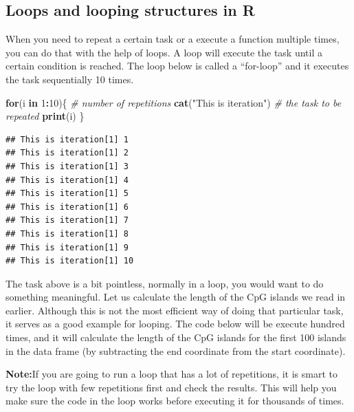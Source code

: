 \documentclass[12pt,]{krantz}
\newenvironment{Shaded}{\begin{snugshade}}{\end{snugshade}}
\newcommand{\CommentTok}[1]{\textcolor[rgb]{0.56,0.35,0.01}{\textit{#1}}}
\newcommand{\ControlFlowTok}[1]{\textcolor[rgb]{0.13,0.29,0.53}{\textbf{#1}}}
\newcommand{\DecValTok}[1]{\textcolor[rgb]{0.00,0.00,0.81}{#1}}
\newcommand{\KeywordTok}[1]{\textcolor[rgb]{0.13,0.29,0.53}{\textbf{#1}}}
\newcommand{\NormalTok}[1]{#1}
\newcommand{\OperatorTok}[1]{\textcolor[rgb]{0.81,0.36,0.00}{\textbf{#1}}}
\newcommand{\StringTok}[1]{\textcolor[rgb]{0.31,0.60,0.02}{#1}}
\theoremstyle{definition}
\theoremstyle{definition}
\theoremstyle{definition}
\theoremstyle{remark}
\begin{document}
\hypertarget{loops-and-looping-structures-in-r}{%
\subsection{Loops and looping structures in
R}\label{loops-and-looping-structures-in-r}}

When you need to repeat a certain task or a execute a function multiple
times, you can do that with the help of loops. A loop will execute the
task until a certain condition is reached. The loop below is called a
``for-loop'' and it executes the task sequentially 10 times.

\begin{Shaded}
\begin{Highlighting}[]
\ControlFlowTok{for}\NormalTok{(i }\ControlFlowTok{in} \DecValTok{1}\OperatorTok{:}\DecValTok{10}\NormalTok{)\{ }\CommentTok{# number of repetitions}
\KeywordTok{cat}\NormalTok{(}\StringTok{"This is iteration"}\NormalTok{) }\CommentTok{# the task to be repeated}
\KeywordTok{print}\NormalTok{(i)}
\NormalTok{\}}
\end{Highlighting}
\end{Shaded}

\begin{verbatim}
## This is iteration[1] 1
## This is iteration[1] 2
## This is iteration[1] 3
## This is iteration[1] 4
## This is iteration[1] 5
## This is iteration[1] 6
## This is iteration[1] 7
## This is iteration[1] 8
## This is iteration[1] 9
## This is iteration[1] 10
\end{verbatim}

The task above is a bit pointless, normally in a loop, you would want to
do something meaningful. Let us calculate the length of the CpG islands
we read in earlier. Although this is not the most efficient way of doing
that particular task, it serves as a good example for looping. The code
below will be execute hundred times, and it will calculate the length of
the CpG islands for the first 100 islands in the data frame (by
subtracting the end coordinate from the start coordinate).

\textbf{Note:}If you are going to run a loop that has a lot of
repetitions, it is smart to try the loop with few repetitions first and
check the results. This will help you make sure the code in the loop
works before executing it for thousands of times.
\end{document}
